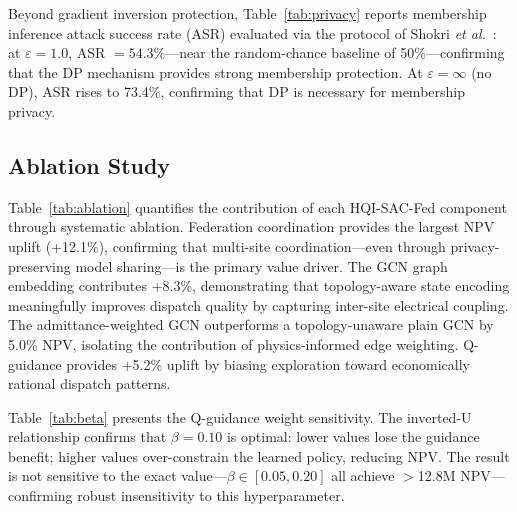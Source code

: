\documentclass[journal]{IEEEtran}
\begin{document}
Beyond gradient inversion protection, Table~\ref{tab:privacy} reports
membership inference attack success rate (ASR) evaluated via the
protocol of Shokri \textit{et al.}~\cite{shokri2017membership}: at
$\varepsilon{=}1.0$, ASR $= 54.3\%$---near the random-chance baseline
of 50\%---confirming that the DP mechanism provides strong membership
protection. At $\varepsilon{=}\infty$ (no DP), ASR rises to 73.4\%,
confirming that DP is necessary for membership privacy.

\subsection{Ablation Study}

Table~\ref{tab:ablation} quantifies the contribution of each
HQI-SAC-Fed component through systematic ablation. Federation
coordination provides the largest NPV uplift (+12.1\%), confirming
that multi-site coordination---even through privacy-preserving model
sharing---is the primary value driver. The GCN graph embedding
contributes +8.3\%, demonstrating that topology-aware state encoding
meaningfully improves dispatch quality by capturing inter-site
electrical coupling. The admittance-weighted GCN outperforms a
topology-unaware plain GCN by 5.0\% NPV, isolating the contribution
of physics-informed edge weighting. Q-guidance provides +5.2\% uplift
by biasing exploration toward economically rational dispatch patterns.

Table~\ref{tab:beta} presents the Q-guidance weight sensitivity.
The inverted-U relationship confirms that $\beta{=}0.10$ is optimal:
lower values lose the guidance benefit; higher values
over-constrain the learned policy, reducing NPV. The result is not
sensitive to the exact value---$\beta \in [0.05, 0.20]$ all achieve
$>$12.8M NPV---confirming robust insensitivity to this hyperparameter.
\end{document}
